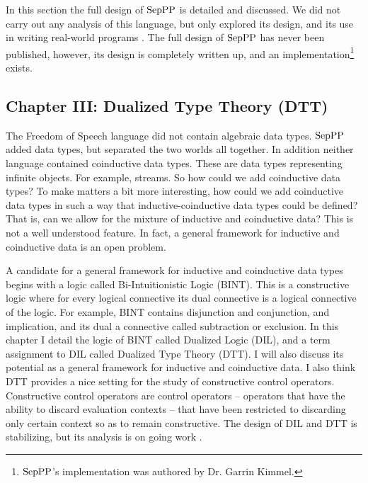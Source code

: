 In this section the full design of $\text{SepPP}$ is detailed and discussed.
We did not carry out any analysis of this language, but only explored
its design, and its use in writing real-world programs
\cite{Kimmel:2013,Kimmel:2012}.  The full design of $\text{SepPP}$ has never
been published, however, its design is completely written up, and
an implementation\footnote{$\text{SepPP}$'s implementation was authored by
  Dr. Garrin Kimmel.}  exists.

\subsection{Chapter III: Dualized Type Theory (DTT)}
\label{subsec:dualized_type_theory}
The Freedom of Speech language did not contain algebraic data types.
$\text{SepPP}$ added data types, but separated the two worlds all together.
In addition neither language contained coinductive data types.  These
are data types representing infinite objects.  For example, streams.
So how could we add coinductive data types?  To make matters a bit
more interesting, how could we add coinductive data types in such a
way that inductive-coinductive data types could be defined?  That is,
can we allow for the mixture of inductive and coinductive data?  This
is not a well understood feature.  In fact, a general framework for
inductive and coinductive data is an open problem.    

A candidate for a general framework for inductive and coinductive data
types begins with a logic called Bi-Intuitionistic Logic (BINT). This
is a constructive logic where for every logical connective its dual
connective is a logical connective of the logic.  For example, BINT
contains disjunction and conjunction, and implication, and its dual a
connective called subtraction or exclusion.  In this chapter I detail
the logic of BINT called Dualized Logic (DIL), and a term assignment
to DIL called Dualized Type Theory (DTT).  I will also discuss its
potential as a general framework for inductive and coinductive data.
I also think DTT provides a nice setting for the study of constructive
control operators. Constructive control operators are control
operators -- operators that have the ability to discard evaluation
contexts -- that have been restricted to discarding only certain
context so as to remain constructive.  The design of DIL and DTT is
stabilizing, but its analysis is on going work \cite{Stump:2013}.

